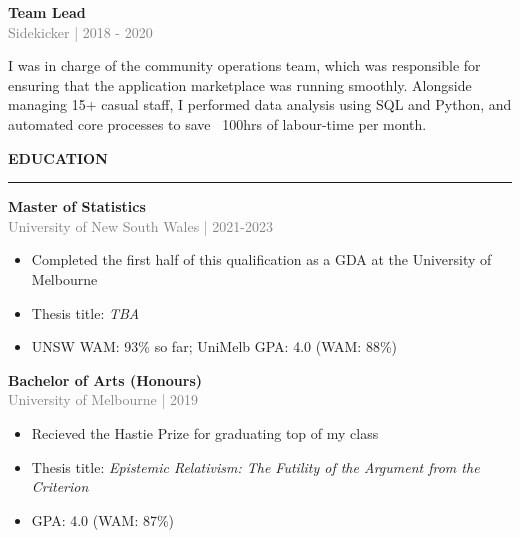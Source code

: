 \documentclass[10pt]{article}
\begin{document}
\vspace{0.5cm}
{\bf Team Lead} \\
\textcolor{gray}{Sidekicker | 2018 - 2020} \\[3pt]
\begin{small}
 I was in charge of the community operations team,  which was responsible for ensuring that the application marketplace was running smoothly. 
 Alongside managing 15+ casual staff, I performed data analysis using SQL and Python, and automated core processes to save ~100hrs of labour-time per month.
\end{small}


\vspace{1cm}
\begin{large}
{\bf EDUCATION} \\
\textcolor{gray}{\rule{2cm}{2mm}}
\end{large}
\vspace{5pt}

{\bf Master of Statistics} \\
\textcolor{gray}{University of New South Wales | 2021-2023}
\begin{small}
\begin{itemize}
  \item Completed the first half of this qualification as a GDA at the University of Melbourne
  \item Thesis title: \textit{TBA}
  \item UNSW WAM: 93\% so far; UniMelb GPA: 4.0 (WAM: 88\%)
\end{itemize}
\end{small}

\vspace{0.5cm}
{\bf Bachelor of Arts (Honours)} \\
\textcolor{gray}{University of Melbourne | 2019}
\begin{small}
\begin{itemize}
  \item Recieved the Hastie Prize for graduating top of my class
  \item Thesis title: \textit{Epistemic Relativism: The Futility of the Argument from the Criterion}
  \item GPA: 4.0 (WAM: 87\%)
\end{itemize}
\end{small}
\end{document}
